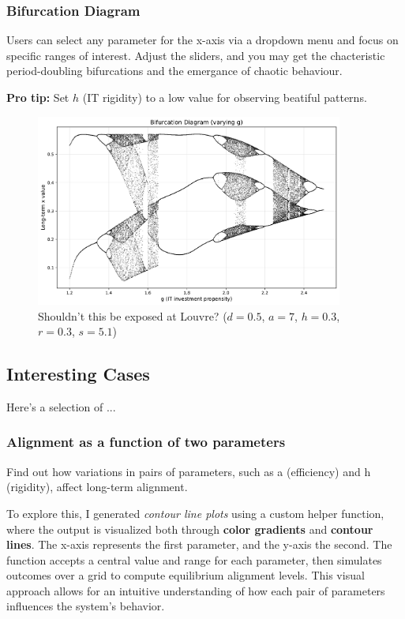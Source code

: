 \documentclass[a4paper, 10pt]{article}
\begin{document}
\subsubsection{Bifurcation Diagram}
Users can select any parameter for the x-axis via a dropdown menu and focus on specific ranges of interest.
Adjust the sliders, and you may get the chacteristic period-doubling bifurcations and the emergance of chaotic behaviour.

\textbf{Pro tip:} Set $h$ (IT rigidity) to a low value for observing beatiful patterns.

\begin{figure}[H]
	\centering
	\includegraphics[width=0.9\textwidth]{../images/results/big-diagram.pdf}
	\caption{Shouldn't this be exposed at Louvre? ($d = 0.5$, $a = 7$, $h = 0.3$, $r = 0.3$, $s = 5.1$)}
	\label{fig:bifurcation}
\end{figure}

\clearpage

\subsection{Interesting Cases}
Here's a selection of ... 

\subsubsection{Alignment as a function of two parameters}
Find out how variations in pairs of parameters, such as a (efficiency) and h (rigidity), affect long-term alignment.

To explore this, I generated \textit{contour line plots} using a custom helper function, where the output is visualized both through \textbf{color gradients} and \textbf{contour lines}.
The x-axis represents the first parameter, and the y-axis the second. The function accepts a central value and range for each parameter, then simulates outcomes over a grid to compute equilibrium alignment levels. This visual approach allows for an intuitive understanding of how each pair of parameters influences the system’s behavior.
\end{document}
